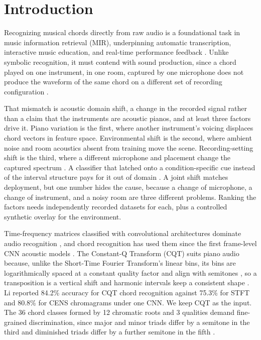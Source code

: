 \documentclass[pdflatex,sn-mathphys-num,iicol]{sn-jnl}
\begin{document}
\section{Introduction}\label{sec_introduction}

Recognizing musical chords directly from raw audio is a foundational task in music information retrieval (MIR), underpinning automatic transcription, interactive music education, and real-time performance feedback \cite{Kusaka2024,zbaltan2024}. Unlike symbolic recognition, it must contend with sound production, since a chord played on one instrument, in one room, captured by one microphone does not produce the waveform of the same chord on a different set of recording configuration \cite{Kusaka2024}.

That mismatch is acoustic domain shift, a change in the recorded signal rather than a claim that the instruments are acoustic pianos, and at least three factors drive it. Piano variation is the first, where another instrument's voicing displaces chord vectors in feature space. Environmental shift is the second, where ambient noise and room acoustics absent from training move the scene. Recording-setting shift is the third, where a different microphone and placement change the captured spectrum \cite{Kusaka2024}. A classifier that latched onto a condition-specific cue instead of the interval structure pays for it out of domain \cite{Geirhos2020}. A joint shift matches deployment, but one number hides the cause, because a change of microphone, a change of instrument, and a noisy room are three different problems. Ranking the factors needs independently recorded datasets for each, plus a controlled synthetic overlay for the environment.

Time-frequency matrices classified with convolutional architectures dominate audio recognition \cite{Zaman2023}, and chord recognition has used them since the first frame-level CNN acoustic models \cite{Korzeniowski_2016}. The Constant-Q Transform (CQT) suits piano audio because, unlike the Short-Time Fourier Transform's linear bins, its bins are logarithmically spaced at a constant quality factor and align with semitones \cite{Lacoste2007}, so a transposition is a vertical shift and harmonic intervals keep a consistent shape \cite{Li2021}. Li \cite{Li2021} reported 84.2\% accuracy for CQT chord recognition against 75.3\% for STFT and 80.8\% for CENS chromagrams under one CNN. We keep CQT as the input. The 36 chord classes formed by 12 chromatic roots and 3 qualities demand fine-grained discrimination, since major and minor triads differ by a semitone in the third and diminished triads differ by a further semitone in the fifth \cite{Harte2010}. %
\end{document}

